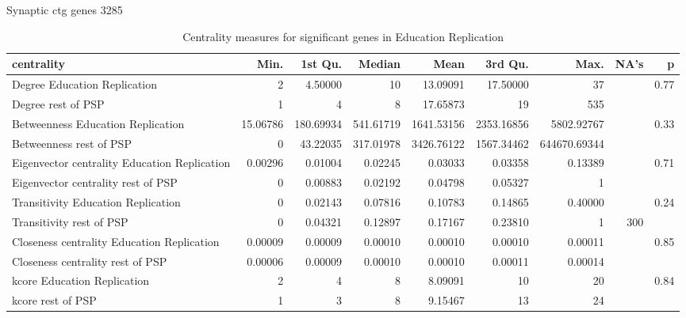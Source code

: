 Synaptic ctg genes  3285%
\begin{table}[ht]
\centering
\begin{adjustbox}{width=\textwidth}


\begin{tabular}{lrrrrrrrr}
  \hline
centrality & Min. & 1st Qu. & Median & Mean & 3rd Qu. & Max. & NA's & p \\ 
  \hline
Degree Education Replication & 2   & 4.50000 & 10   & 13.09091 & 17.50000 & 37   &  & 0.77 \\ 
  Degree rest of PSP & 1   & 4   & 8   & 17.65873 & 19   & 535   &  &  \\ 
  Betweenness Education Replication & 15.06786 & 180.69934 & 541.61719 & 1641.53156 & 2353.16856 & 5802.92767 &  & 0.33 \\ 
  Betweenness rest of PSP & 0   & 43.22035 & 317.01978 & 3426.76122 & 1567.34462 & 644670.69344 &  &  \\ 
  Eigenvector centrality Education Replication & 0.00296 & 0.01004 & 0.02245 & 0.03033 & 0.03358 & 0.13389 &  & 0.71 \\ 
  Eigenvector centrality rest of PSP & 0   & 0.00883 & 0.02192 & 0.04798 & 0.05327 & 1   &  &  \\ 
  Transitivity Education Replication & 0   & 0.02143 & 0.07816 & 0.10783 & 0.14865 & 0.40000 &  & 0.24 \\ 
  Transitivity rest of PSP & 0   & 0.04321 & 0.12897 & 0.17167 & 0.23810 & 1   & 300 & \\ 
  Closeness centrality Education Replication & 0.00009 & 0.00009 & 0.00010 & 0.00010 & 0.00010 & 0.00011 &  & 0.85 \\ 
  Closeness centrality rest of PSP & 0.00006 & 0.00009 & 0.00010 & 0.00010 & 0.00011 & 0.00014 &  & \\ 
  kcore Education Replication & 2   & 4   & 8   & 8.09091 & 10   & 20   &  & 0.84 \\ 
  kcore rest of PSP & 1   & 3   & 8   & 9.15467 & 13   & 24   &  &  \\ 
   \hline
\end{tabular}
\end{adjustbox}
\caption{Centrality measures for significant genes in Education Replication} 
\label{tab:Centrality measures for significant genes in Education Replication}
\end{table}


